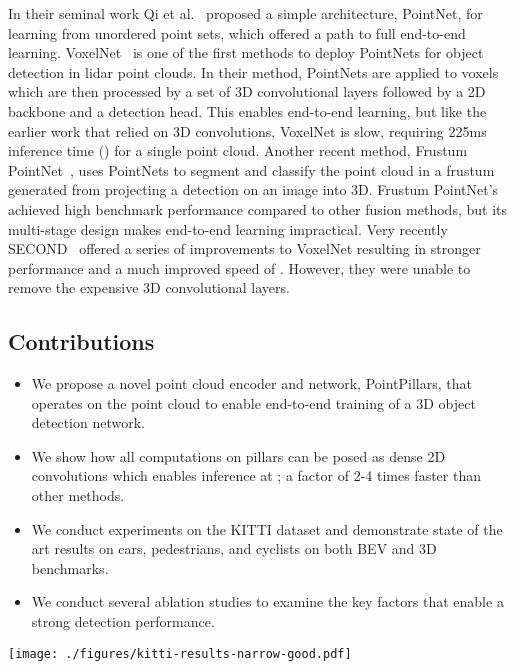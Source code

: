 \documentclass[10pt,twocolumn,letterpaper]{article}
\newcommand{\hertz}{\xspace} \newcommand{\maxhertz}{\xspace} \newcommand{\decorate}{9\xspace} \newcommand{\maxpillars}{12000\xspace} \newcommand{\maxpts}{100\xspace} \newcommand{\xyres}{0.16\xspace} \newcommand{\lidar}{lidar\xspace}
\newcommand{\squeeze}{\vspace{-0.5mm}}
\begin{document}
In their seminal work Qi et al.~\cite{pointnet, pointnetplusplus} proposed a simple architecture, PointNet, for learning from unordered point sets, which offered a path to full end-to-end learning.
VoxelNet~\cite{voxelnet} is one of the first methods to deploy PointNets for object detection in \lidar point clouds.
In their method, PointNets are applied to voxels which are then processed by a set of 3D convolutional layers followed by a 2D backbone and a detection head.
This enables end-to-end learning, but like the earlier work that relied on 3D convolutions, VoxelNet is slow, requiring 225ms inference time () for a single point cloud.
Another recent method, Frustum PointNet~\cite{frustum}, uses PointNets to segment and classify the point cloud in a frustum generated from projecting a detection on an image into 3D.
Frustum PointNet's achieved high benchmark performance compared to other fusion methods, but its multi-stage design makes end-to-end learning impractical.
Very recently SECOND~\cite{second} offered a series of improvements to VoxelNet resulting in stronger performance and a much improved speed of .
However, they were unable to remove the expensive 3D convolutional layers.

\subsection{Contributions}
\squeeze
\begin{itemize}
\setlength\itemsep{1mm}
\item We propose a novel point cloud encoder and network, PointPillars, that operates on the point cloud to enable end-to-end training of a 3D object detection network.
\item We show how all computations on pillars can be posed as dense 2D convolutions which enables inference at \hertz; a factor of 2-4 times faster than other methods.
\item We conduct experiments on the KITTI dataset and demonstrate state of the art results on cars, pedestrians, and cyclists on both BEV and 3D benchmarks.
\item We conduct several ablation studies to examine the key factors that enable a strong detection performance.
\end{itemize}
 


\begin{figure*}
\begin{center}
\texttt{[image: ./figures/kitti-results-narrow-good.pdf]}
\end{center}
\caption{Qualitative analysis of KITTI results.
We show a bird's-eye view of the lidar point cloud (top), as well as the 3D bounding boxes projected into the image for clearer visualization.
Note that our method \textit{only} uses lidar.
We show predicted boxes for car (orange), cyclist (red) and pedestrian (blue).
Ground truth boxes are shown in gray.
The orientation of boxes is shown by a line connected the bottom center to the front of the box.
}
\label{fig:kitti_visualize}
\end{figure*}
\end{document}
